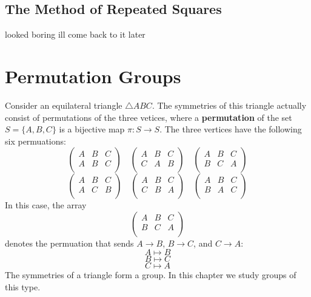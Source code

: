 \documentclass[12pt, letterpaper]{report}
\begin{document}
\section{The Method of Repeated Squares}
looked boring ill come back to it later 
\chapter{Permutation Groups}
Consider an equilateral triangle \(\triangle ABC\). The symmetries of this triangle actually consist of permutations of the three vetices, where a \textbf{permutation}  of the set \(S=\{ A,B,C \} \) is a bijective map \(\pi :S\to S	\). The three vertices have the following six permuations: 
\[
	\begin{pmatrix}
		A &B  &C   \\
		 A&B  &C   \\
	\end{pmatrix}\quad \begin{pmatrix}
		 A&B  &C   \\
		 C&A  &B   \\
	\end{pmatrix}\quad \begin{pmatrix}
		A &B  &C   \\
		 B&C  &A   \\
	\end{pmatrix}
\]
\[
	\begin{pmatrix}
		A &B  &C   \\
		 A&C  &B   \\
	\end{pmatrix}\quad \begin{pmatrix}
		A &B  &C   \\
		 C&B  &A   \\
	\end{pmatrix}\quad \begin{pmatrix}
		A &B  &C   \\
		 B&A  &C   \\
	\end{pmatrix}
\]
In this case, the array 
\[
	\begin{pmatrix}
		A &B  &C   \\
		 B&C  &A   \\
	\end{pmatrix}
\]
denotes the permuation that sends \(A\to B\), \(B\to C\), and \(C\to A\):
\[
	A\mapsto B
\]
\[
	B\mapsto C
\]
\[
	C\mapsto A
\]
The symmetries of a triangle form a group. In this chapter we study groups of this type.
\end{document}
